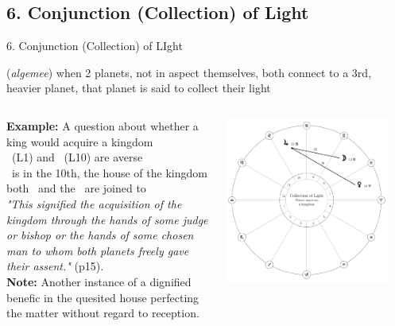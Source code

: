 \subsection{6. Conjunction (Collection) of Light}
\begin{frame}[t]{6. Conjunction (Collection) of LIght}
\begin{description}[style=nextline]
\item[6. Collection of Light] (\textsl{algemee}) when 2 planets, not in aspect themselves, both connect to a 3rd, heavier planet, that planet is said to collect their light

\begin{columns}[T, onlytextwidth]
\textbf{Example:} A question about whether a king would acquire a kingdom \\
\ul
\Venus\ (L1) and \Moon\ (L10) are averse \\
\Jupiter\ is in the 10th, the house of the kingdom \\
both \Venus\ and the \Moon\ are joined to \Jupiter \\
\vspace{0.25cm}
\textsl{"This signified the acquisition of the kingdom through the hands of some judge or bishop or the hands of some chosen man to whom both planets freely gave their assent."} (p15). \\
\vspace{0.25cm}
\textbf{Note:} Another instance of a dignified benefic in the quesited house perfecting the matter without regard to reception.
\vspace{-0.5cm}
\begin{center}
{\includegraphics[width=0.9\textwidth]{charts/61-collection}} \\
\end{center}
\end{columns}
\end{description}
\end{frame}
